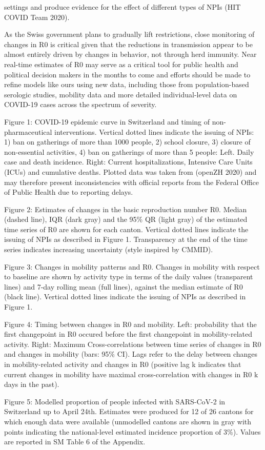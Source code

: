 settings and produce evidence for the effect of different types of NPIs (HIT COVID Team 2020).

As the Swiss government plans to gradually lift restrictions, close monitoring of changes in R0 is critical given that the reductions in transmission appear to be almost entirely driven by changes in behavior, not through herd immunity. Near real-time estimates of R0 may serve as a critical tool for public health and political decision makers in the months to come and efforts should be made to refine models like ours using new data, including those from population-based serologic studies, mobility data and more detailed individual-level data on COVID-19 cases across the spectrum of severity.

Figure 1: COVID-19 epidemic curve in Switzerland and timing of non-pharmaceutical interventions.  Vertical dotted lines indicate the issuing of NPIs: 1) ban on gatherings of more than 1000 people, 2) school closure, 3) closure of non-essential activities, 4) ban on gatherings of more than 5 people:  Left. Daily case and death incidence. Right: Current hospitalizations, Intensive Care Units (ICUs) and cumulative deaths. Plotted data was taken from (openZH 2020) and may therefore present inconsistencies with official reports from the Federal Office of Public Health due to reporting delays.

Figure 2: Estimates of changes in the basic reproduction number R0. Median (dashed line), IQR (dark gray) and the 95\% QR (light gray) of the estimated time series of R0 are shown for each canton. Vertical dotted lines indicate the issuing of NPIs as described in Figure 1. Transparency at the end of the time series indicates increasing uncertainty (style inspired by CMMID).

Figure 3: Changes in mobility patterns and R0. Changes in mobility with respect to baseline are shown by activity type in terms of the daily values (transparent lines) and 7-day rolling mean (full lines), against the median estimate of R0 (black line). Vertical dotted lines indicate the issuing of NPIs as described in Figure 1.

Figure 4: Timing between changes in R0 and mobility. Left: probability that the first changepoint in R0 occured before the first changepoint in mobility-related activity. Right: Maximum Cross-correlations between time series of changes in R0 and changes in mobility (bars: 95\% CI). Lags refer to the delay between changes in mobility-related activity and changes in R0 (positive lag k indicates that current changes in mobility have maximal cross-correlation with changes in R0 k days in the past).

Figure 5: Modelled proportion of people infected with SARS-CoV-2 in Switzerland up to April 24th. Estimates were produced for 12 of 26 cantons for which enough data were available (unmodelled cantons are shown in gray with points indicating the national-level estimated incidence proportion of 3\%). Values are reported in SM Table 6 of the Appendix. 



